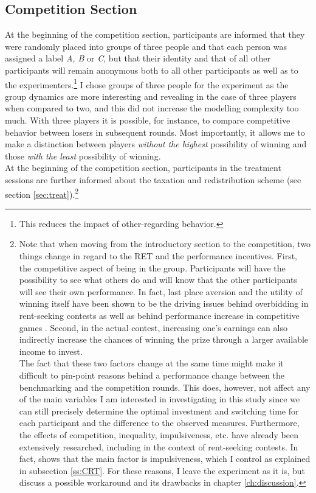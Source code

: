     
    \subsection{Competition Section}
    \label{ss:compt}
    
    At the beginning of the competition section, participants are informed that they were randomly placed into groups of three people and that each person was assigned a label \textit{A, B} or \textit{C}, but that their identity and that of all other participants will remain anonymous both to all other participants as well as to the experimenters.\footnote{This reduces the impact of other-regarding behavior.} I chose groups of three people for the experiment as the group dynamics are more interesting and revealing in the case of three players when compared to two, and this did not increase the modelling complexity too much. With three players it is possible, for instance, to compare competitive behavior between losers in subsequent rounds. Most importantly, it allows me to make a distinction between players \textit{without the highest} possibility of winning and those \textit{with the least} possibility of winning.\\
    
    At the beginning of the competition section, participants in the treatment sessions are further informed about the taxation and redistribution scheme (see section \ref{sec:treat}).\footnote{Note that when moving from the introductory section to the competition, two things change in regard to the RET and the performance incentives. First, the competitive aspect of being in the group. Participants will have the possibility to see what others do and will know that the other participants will see their own performance. In fact, last place aversion and the utility of winning itself have been shown to be the driving issues behind overbidding in rent-seeking contests as well as behind performance increase in competitive games \citep{sheremeta2013}. Second, in the actual contest, increasing one's earnings can also indirectly increase the chances of winning the prize through a larger available income to invest.\\
    The fact that these two factors change at the same time might make it difficult to pin-point reasons behind a performance change between the benchmarking and the competition rounds. This does, however, not affect any of the main variables I am interested in investigating in this study since we can still precisely determine the optimal investment and switching time for each participant and the difference to the observed measures. Furthermore, the effects of competition, inequality, impulsiveness, etc. have already been extensively researched, including in the context of rent-seeking contests. In fact, \cite{sheremeta2016} shows that the main factor is impulsiveness, which I control as explained in subsection \ref{ss:CRT}. For these reasons, I leave the experiment as it is, but discuss a possible workaround and its drawbacks in chapter \ref{ch:discussion}.} 
    
